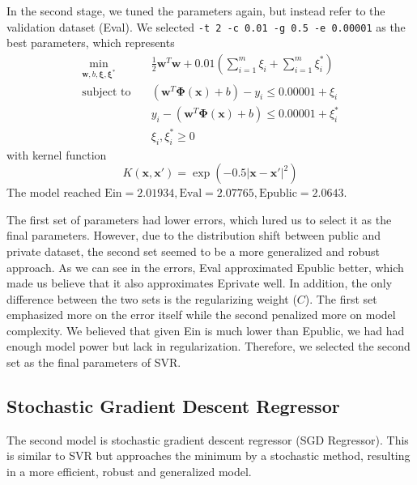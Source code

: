 \documentclass[10pt,letterpaper]{article}
\begin{document}
In the second stage, we tuned the parameters again, but instead refer to the validation dataset (Eval). We selected \texttt{-t 2 -c 0.01 -g 0.5 -e 0.00001} as the best parameters, which represents
\begin{align*}
	\underset{\mathbf{w}, b, \mathbf{\xi}, \mathbf{\xi^*}}{\min} \quad & \frac{1}{2}\mathbf{w}^T\mathbf{w} + 0.01\left(\sum_{i=1}^m \xi_i + \sum_{i=1}^m \xi^*_i\right) \\
	\text{subject to} \quad & (\mathbf{w}^T \mathbf{\Phi(x)} + b) - y_i \le 0.00001 + \xi_i \\
	& y_i - (\mathbf{w}^T \mathbf{\Phi(x)} + b) \le 0.00001 + \xi^*_i \\
	& \xi_i, \xi^*_i \ge 0
\end{align*}
with kernel function
$$
	K(\mathbf{x}, \mathbf{x'}) = \exp(-0.5 \lvert \mathbf{x} - \mathbf{x'}\rvert^2)
$$
The model reached $\text{Ein} = 2.01934, \text{Eval} = 2.07765, \text{Epublic} = 2.0643$. 

The first set of parameters had lower errors, which lured us to select it as the final parameters. However, due to the distribution shift between public and private dataset, the second set seemed to be a more generalized and robust approach. As we can see in the errors, Eval approximated Epublic better, which made us believe that it also approximates Eprivate well. In addition, the only difference between the two sets is the regularizing weight ($C$). The first set emphasized more on the error itself while the second penalized more on model complexity. We believed that given Ein is much lower than Epublic, we had had enough model power but lack in regularization. Therefore, we selected the second set as the final parameters of SVR. 


\subsection{Stochastic Gradient Descent Regressor}

The second model is stochastic gradient descent regressor (SGD Regressor). This is similar to SVR but approaches the minimum by a stochastic method, resulting in a more efficient, robust and generalized model.
\end{document}
